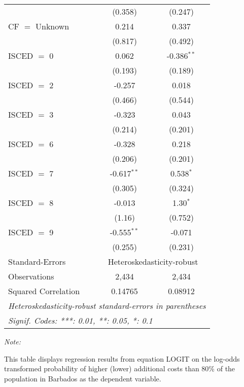 \begin{table}[htbp!]
\begin{adjustbox}{width = 1\textwidth, max height = 0.95\textheight, center}
\begin{threeparttable}[b]
\begin{tabular}{lcc}
                                 & (0.358)       & (0.247)\\   
            CF $=$ Unknown       & 0.214         & 0.337\\   
                                 & (0.817)       & (0.492)\\   
            ISCED $=$ 0          & 0.062         & -0.386$^{**}$\\   
                                 & (0.193)       & (0.189)\\   
            ISCED $=$ 2          & -0.257        & 0.018\\   
                                 & (0.466)       & (0.544)\\   
            ISCED $=$ 3          & -0.323        & 0.043\\   
                                 & (0.214)       & (0.201)\\   
            ISCED $=$ 6          & -0.328        & 0.218\\   
                                 & (0.206)       & (0.201)\\   
            ISCED $=$ 7          & -0.617$^{**}$ & 0.538$^{*}$\\   
                                 & (0.305)       & (0.324)\\   
            ISCED $=$ 8          & -0.013        & 1.30$^{*}$\\   
                                 & (1.16)        & (0.752)\\   
            ISCED $=$ 9          & -0.555$^{**}$ & -0.071\\   
                                 & (0.255)       & (0.231)\\   
            \midrule 
            Standard-Errors & \multicolumn{2}{c}{Heteroskedasticity-robust} \\ 
            Observations         & 2,434         & 2,434\\  
            Squared Correlation  & 0.14765       & 0.08912\\  
            \midrule \midrule
            \multicolumn{3}{l}{\emph{Heteroskedasticity-robust standard-errors in parentheses}}\\
            \multicolumn{3}{l}{\emph{Signif. Codes: ***: 0.01, **: 0.05, *: 0.1}}\\
         \end{tabular}
         
         \begin{tablenotes}\item \medskip \textit{Note:}
            \item This table displays regression results from equation LOGIT on the log-odds transformed probability of higher (lower) additional costs than 80\% of the population in Barbados as the dependent variable. 
         \end{tablenotes}
      \end{threeparttable}
   \end{adjustbox}
\end{table}


